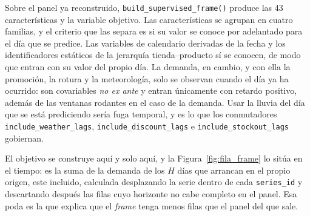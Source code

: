 Sobre el panel ya reconstruido, \texttt{build\_supervised\_frame()} produce las 43 características y la variable objetivo. Las características se agrupan en cuatro familias, y el criterio que las separa es si su valor se conoce por adelantado para el día que se predice. Las variables de calendario derivadas de la fecha y los identificadores estáticos de la jerarquía tienda--producto sí se conocen, de modo que entran con su valor del propio día. La demanda, en cambio, y con ella la promoción, la rotura y la meteorología, solo se observan cuando el día ya ha ocurrido: son covariables \emph{no ex ante} y entran únicamente con retardo positivo, además de las ventanas rodantes en el caso de la demanda. Usar la lluvia del día que se está prediciendo sería fuga temporal, y es lo que los conmutadores \texttt{include\_}\allowbreak\texttt{weather\_}\allowbreak\texttt{lags}, \texttt{include\_}\allowbreak\texttt{discount\_}\allowbreak\texttt{lags} e \texttt{include\_}\allowbreak\texttt{stockout\_}\allowbreak\texttt{lags} gobiernan.

El objetivo se construye aquí y solo aquí, y la Figura~\ref{fig:fila_frame} lo sitúa en el tiempo: es la suma de la demanda de los $H$ días que arrancan en el propio origen, este incluido, calculada desplazando la serie dentro de cada \texttt{series\_id} y descartando después las filas cuyo horizonte no cabe completo en el panel. Esa poda es la que explica que el \textit{frame} tenga menos filas que el panel del que sale.

